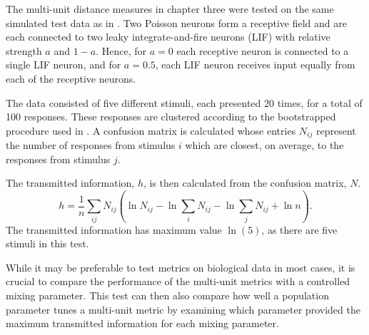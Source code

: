 The multi-unit distance measures  in chapter three were tested on the same simulated test data as in \citep{HoughtonSen2008a}. Two Poisson neurons form a receptive field and are each connected to two leaky integrate-and-fire neurons (LIF) with relative strength $a$ and $1-a$.  Hence, for $a=0$ each receptive neuron is connected to a single LIF neuron, and for $a=0.5$, each LIF neuron receives input equally from each of the receptive neurons.
 
The data consisted of five different stimuli, each presented 20 times, for a total of 100 responses.  These responses are clustered according to the bootstrapped procedure used in \citep{VictorPurpura1996a}. A confusion matrix is calculated whose entries $N_{ij}$ represent the number of responses from stimulus $i$ which are closest, on average, to the responses from stimulus $j$.


The transmitted information, $h$, is then calculated from the confusion matrix, $N$.
\begin{equation}
h = \frac{1}{n} \sum_{ij}N_{ij} \left( \ln N_{ij} - \ln \sum_i N_{ij} - \ln \sum_j N_{ij} + \ln n\right) .
\end{equation}
The transmitted information has maximum value $\ln(5)$, as there are five stimuli in this test.
 
While it may be preferable to test metrics on biological data in most cases, it is crucial to compare the performance of the multi-unit metrics with a controlled mixing parameter.  This test can then also compare how well a population parameter tunes a multi-unit metric by examining which parameter provided the maximum transmitted information for each mixing parameter.


